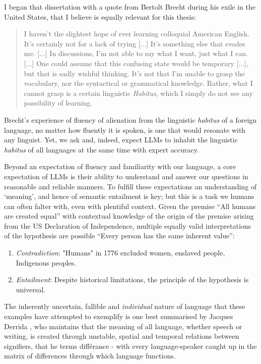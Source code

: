 \documentclass[12pt,twoside]{report}
\begin{document}
I began that dissertation with a quote from Bertolt Brecht during his exile in the United States, that I believe is equally relevant for this thesis:
\begin{quote}
    I haven't the slightest hope of ever learning colloquial American English. It's certainly not for a lack of trying [...] It's something else that evades me. [...] In discussions, I'm not able to say what I want, just what I can. [...] One could assume that this confusing state would be temporary [...], but that is sadly wishful thinking. It's not that I'm unable to grasp the vocabulary, nor the syntactical or grammatical knowledge. Rather, what I cannot grasp is a certain linguistic \textit{Habitus}, which I simply do not see any possibility of learning.\cite{brecht}
\end{quote}

Brecht's experience of fluency of alienation from the linguistic \textit{habitus} of a foreign language, no matter how fluently it is spoken, is one that would resonate with any linguist. Yet, we ask and, indeed, expect LLMs to inhabit the linguistic \textit{habitus} of all languages at the same time with expert accuracy. \newline \par

Beyond an expectation of fluency and familiarity with our language, a core expectation of LLMs is their ability to understand and answer our questions in reasonable and reliable manners. To fulfill these expectations an understanding of `meaning', and hence of semantic entailment is key; but this is a task we humans can often falter with, even with plentiful context. Given the premise ``All humans are created equal'' with contextual knowledge of the origin of the premise arising from the US Declaration of Independence, multiple equally valid interpretations of the hypothesis are possible ``Every person has the same inherent value'':
\begin{enumerate}
    \item \textit{Contradiction}: "Humans" in 1776 excluded women, enslaved people, Indigenous peoples.
    \item \textit{Entailment}: Despite historical limitations, the principle of the hypothesis is universal.
\end{enumerate}

The inherently uncertain, fallible and \textit{individual} nature of language that these examples have attempted to exemplify is one best summarised by Jacques Derrida \cite{derrida1, derrida2, derrida3}, who maintains that the meaning of all language, whether speech or writing, is created through unstable, spatial and temporal relations between signifiers, that he terms différance - with every language-speaker caught up in the matrix of differences through which language functions. \newline \par
\end{document}
